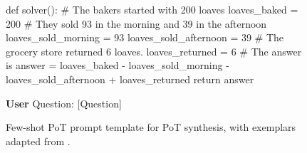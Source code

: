 \begin{figure*}[h]
\begin{mdframed}
        def solver():\newline\hspace*{6mm}    \# The bakers started with 200 loaves\newline\hspace*{6mm}    loaves\_baked = 200\newline\hspace*{6mm}    \# They sold 93 in the morning and 39 in the afternoon\newline\hspace*{6mm}    loaves\_sold\_morning = 93\newline\hspace*{6mm}    loaves\_sold\_afternoon = 39\newline\hspace*{6mm}    \# The grocery store returned 6 loaves.\newline\hspace*{6mm}    loaves\_returned = 6\newline\hspace*{6mm}    \# The answer is\newline\hspace*{6mm}    answer = loaves\_baked - loaves\_sold\_morning - loaves\_sold\_afternoon + loaves\_returned\newline\hspace*{6mm}    return answer
    \end{mdframed}
    \begin{mdframed}
        \textbf{User}\newline
        Question: [Question]
    \end{mdframed}
    \caption{
    Few-shot PoT prompt template for PoT synthesis, with exemplars adapted from \cite{pal, pot}.
    }
    \label{fig:fs-prompt}
\end{figure*}



